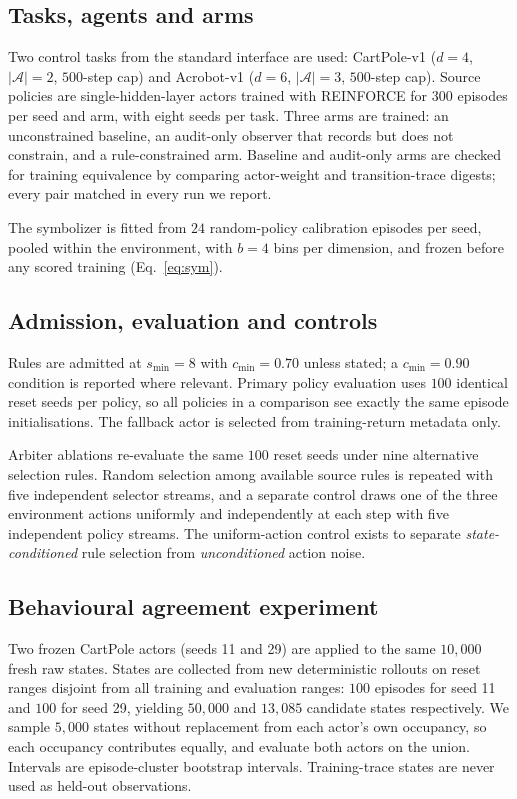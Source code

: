 \documentclass[11pt,a4paper]{article}
\begin{document}
\subsection{Tasks, agents and arms}

Two control tasks from the standard interface \citep{towers2024} are used: CartPole-v1 ($d=4$, $|\mathcal{A}|=2$, $500$-step cap) and Acrobot-v1 ($d=6$, $|\mathcal{A}|=3$, $500$-step cap). Source policies are single-hidden-layer actors trained with REINFORCE \citep{williams1992} for $300$ episodes per seed and arm, with eight seeds per task. Three arms are trained: an unconstrained baseline, an audit-only observer that records but does not constrain, and a rule-constrained arm. Baseline and audit-only arms are checked for training equivalence by comparing actor-weight and transition-trace digests; every pair matched in every run we report.

The symbolizer is fitted from $24$ random-policy calibration episodes per seed, pooled within the environment, with $b=4$ bins per dimension, and frozen before any scored training (Eq.~\eqref{eq:sym}).

\subsection{Admission, evaluation and controls}

Rules are admitted at $s_{\min}=8$ with $c_{\min}=0.70$ unless stated; a $c_{\min}=0.90$ condition is reported where relevant. Primary policy evaluation uses $100$ identical reset seeds per policy, so all policies in a comparison see exactly the same episode initialisations. The fallback actor is selected from training-return metadata only.

Arbiter ablations re-evaluate the same $100$ reset seeds under nine alternative selection rules. Random selection among available source rules is repeated with five independent selector streams, and a separate control draws one of the three environment actions uniformly and independently at each step with five independent policy streams. The uniform-action control exists to separate \emph{state-conditioned} rule selection from \emph{unconditioned} action noise.

\subsection{Behavioural agreement experiment}

Two frozen CartPole actors (seeds 11 and 29) are applied to the same $10{,}000$ fresh raw states. States are collected from new deterministic rollouts on reset ranges disjoint from all training and evaluation ranges: $100$ episodes for seed 11 and $100$ for seed 29, yielding $50{,}000$ and $13{,}085$ candidate states respectively. We sample $5{,}000$ states without replacement from each actor's own occupancy, so each occupancy contributes equally, and evaluate both actors on the union. Intervals are episode-cluster bootstrap intervals. Training-trace states are never used as held-out observations.
\end{document}
